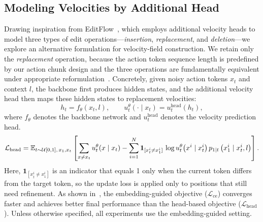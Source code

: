 \subsection{Modeling Velocities by Additional Head}
\label{sec:head_vel}
Drawing inspiration from EditFlow~\citep{havasi2025edit}, which employs additional velocity heads to model three types of edit operations—\emph{insertion}, \emph{replacement}, and \emph{deletion}—we explore an alternative formulation for velocity-field construction. We retain only the \emph{replacement} operation, because the action token sequence length is predefined by our action chunk design and the three operations are fundamentally equivalent under appropriate reformulation~\citep{nguyen2025oneflow,havasi2025edit}. 
Concretely, given noisy action tokens $x_t$ and context $l$, the backbone first produces hidden states, and the additional velocity head then maps these hidden states to replacement velocities:
\begin{equation}
\label{eq:head-verlocity}
h_t = f_{\theta}(x_t, l), \qquad
u_t^{\theta}(\cdot \mid x_t) = u_t^{\text{head}}(h_t),
\end{equation}
where $f_{\theta}$ denotes the backbone network and $u_t^{\text{head}}$ denotes the velocity prediction head.
\begin{equation}
\small
\mathcal{L_\text{head}}
=
\mathbb{E}_{t \sim \mathcal{U}[0,1],\, {x}_1, {x}_t}
\left[
\sum_{x\neq x_t} u_t^\theta(x\mid x_t)
-
\sum_{i=1}^{N}\mathbf{1}_{[x^i_t\neq x^i_1]}\,
\log u_t^\theta\!\left(x^i\mid x^i_t\right)p_{1 \mid t}\left( {x}^i_1 \mid {x}^i_t, {l}\right)
\right].
\end{equation}
\noindent Here, \(\mathbf{1}_{[x_t^i \neq x_1^i]}\) is an indicator that equals 1 only when the current token differs from the target token, so the update loss is applied only to positions that still need refinement.
As shown in~, the embedding-guided objective (\(\mathcal{L}_{\text{ce}}\)) converges faster and achieves better final performance than the head-based objective (\(\mathcal{L}_{\text{head}}\)). Unless otherwise specified, all experiments use the embedding-guided setting.

